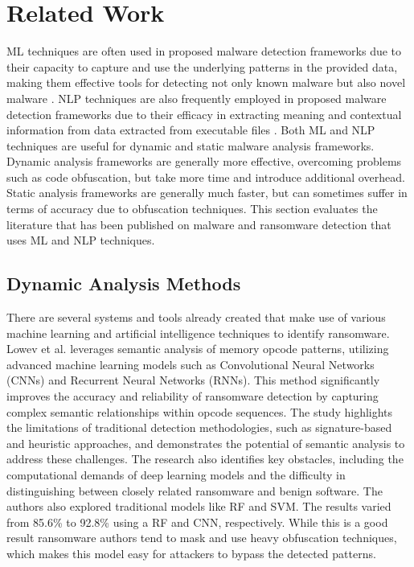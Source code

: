 \documentclass[conference]{IEEEtran}
\begin{document}
\section{Related Work}
ML techniques are often used in proposed malware detection frameworks due to their capacity to capture and use the underlying patterns in the provided data, making them effective tools for detecting not only known malware but also novel malware \cite{singh2022ransomware} \cite{Hwang2020} \cite{Ahmed2021}. NLP techniques are also frequently employed in proposed malware detection frameworks due to their efficacy in extracting meaning and contextual information from data extracted from executable files \cite{Karbab2019} \cite{Mimura2022}. Both ML and NLP techniques are useful for dynamic and static malware analysis frameworks. Dynamic analysis frameworks are generally more effective, overcoming problems such as code obfuscation, but take more time and introduce additional overhead. Static analysis frameworks are generally much faster, but can sometimes suffer in terms of accuracy due to obfuscation techniques. This section evaluates the literature that has been published on malware and ransomware detection that uses ML and NLP techniques. 
\subsection{Dynamic Analysis Methods}
There are several systems and tools already created that make use of various machine learning and artificial intelligence techniques to identify ransomware. Lowev et al. \cite{Lowev} leverages semantic analysis of memory opcode patterns, utilizing advanced machine learning models such as Convolutional Neural Networks (CNNs) and Recurrent Neural Networks (RNNs). This method significantly improves the accuracy and reliability of ransomware detection by capturing complex semantic relationships within opcode sequences. The study highlights the limitations of traditional detection methodologies, such as signature-based and heuristic approaches, and demonstrates the potential of semantic analysis to address these challenges. The research also identifies key obstacles, including the computational demands of deep learning models and the difficulty in distinguishing between closely related ransomware and benign software. The authors also explored traditional models like RF and SVM. The results varied from 85.6\% to 92.8\% using a RF and CNN, respectively. While this is a good result ransomware authors tend to mask and use heavy obfuscation techniques, which makes this model easy for attackers to bypass the detected patterns.\\ 
\end{document}
